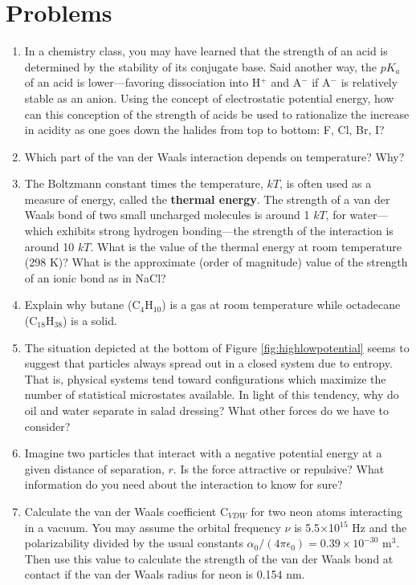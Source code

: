 \section{Problems}
\begin{enumerate}

\item {In a chemistry class, you may have learned that the strength of an acid is determined by the stability of its conjugate base. Said another way, the $pK_a$ of an acid is lower---favoring dissociation into H$^+$ and A$^-$ if A$^-$ is relatively stable as an anion. Using the concept of electrostatic potential energy, how can this conception of the strength of acids be used to rationalize the increase in acidity as one goes down the halides from top to bottom: F, Cl, Br, I?}

\item {Which part of the van der Waals interaction depends on temperature? Why?}

\item {The Boltzmann constant times the temperature, $kT$, is often used as a measure of energy, called the \textbf{thermal energy}. The strength of a van der Waals bond of two small uncharged molecules is around 1 $kT$, for water---which exhibits strong hydrogen bonding---the strength of the interaction is around 10 $kT$. What is the value of the thermal energy at room temperature (298 K)? What is the approximate (order of magnitude) value of the strength of an ionic bond as in NaCl?}

\item {Explain why butane (C$_4$H$_{10}$) is a gas at room temperature while octadecane (C$_{18}$H$_{38}$) is a solid.}

\item {The situation depicted at the bottom of Figure \ref{fig:highlowpotential} seems to suggest that particles always spread out in a closed system due to entropy. That is, physical systems tend toward configurations which maximize the number of statistical microstates available. In light of this tendency, why do oil and water separate in salad dressing? What other forces do we have to consider?}

\item {Imagine two particles that interact with a negative potential energy at a given distance of separation, $r$. Is the force attractive or repulsive? What information do you need about the interaction to know for sure?}

\item {Calculate the van der Waals coefficient C$_{VDW}$ for two neon atoms interacting in a vacuum. You may assume the orbital frequency $\nu$ is 5.5$\times$10$^{15}$ Hz and the polarizability divided by the usual constants $\alpha_{0}/(4\pi\epsilon_{0})=0.39\times10^{-30}$ m$^3$. Then use this value to calculate the strength of the van der Waals bond at contact if the van der Waals radius for neon is 0.154 nm.}


\end{enumerate}
